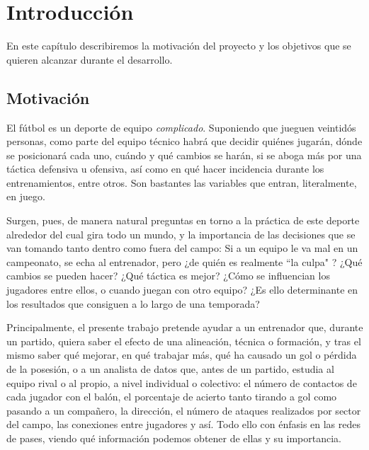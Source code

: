 \chapter{Introducción}
En este capítulo describiremos la motivación del proyecto y los objetivos que
se quieren alcanzar durante el desarrollo. 

\section{Motivación}
El fútbol es un deporte de equipo  \textit{complicado}. Suponiendo que 
jueguen veintidós personas, como parte del equipo técnico habrá que 
decidir quiénes jugarán, dónde se posicionará cada uno, cuándo y qué 
cambios se harán, si se aboga más por una táctica defensiva u ofensiva, 
así como en qué hacer incidencia durante los entrenamientos, entre otros. 
Son bastantes las variables que entran, literalmente, en juego. 

Surgen, pues, de manera natural preguntas en torno a la práctica de 
este deporte alrededor del cual gira todo un mundo, y la importancia 
de las decisiones que se van tomando tanto dentro como fuera del 
campo: Si a un equipo le va mal en un campeonato, se echa al entrenador, pero ¿de quién 
es realmente ``la culpa" \cite{cambio-entrenador}? ¿Qué cambios se pueden hacer? 
¿Qué táctica es mejor? ¿Cómo se influencian los 
jugadores entre ellos, o cuando juegan con otro equipo? ¿Es ello determinante en los 
resultados que consiguen a lo largo de una temporada?

Principalmente, el presente trabajo pretende ayudar a un 
entrenador que, durante un partido, quiera saber el efecto de una 
alineación, técnica o formación, y tras el mismo saber 
qué mejorar, en qué trabajar más, qué ha causado un gol o pérdida 
de la posesión, o a un analista de datos que, antes de un partido, 
estudia al equipo rival o al propio, a nivel individual o colectivo: 
el número de contactos de cada jugador con el balón, el porcentaje 
de acierto tanto tirando a gol como pasando a un compañero, la 
dirección, el número de ataques realizados por sector del campo, 
las conexiones entre jugadores y así. Todo ello con énfasis en las 
redes de pases, viendo qué información podemos obtener de ellas y su 
importancia. 

